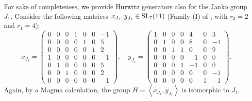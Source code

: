 \documentclass{amsart}
\theoremstyle{remark}
\begin{document}
For sake of completeness, we  provide Hurwitz generators also for the Janko  group $J_1$.
Consider the following matrices $x_{J_1},y_{J_1}\in {\mathop{\rm SL}\nolimits}_7(11)$ (Family (I) of \cite{TV2}, with $r_3=2$ and $r_4=4$):
$$
x_{J_1}=\begin{pmatrix}
 0 &  0 &  0 &  1 &  0 &  0 & -1\\
 0 &  0 &  0 &  0 &  1 &  0 &  5\\
 0 &  0 &  0 &  0 &  0 &  1 &  2\\
 1 &  0 &  0 &  0 &  0 &  0 & -1\\
 0 &  1 &  0 &  0 &  0 &  0 &  5\\
 0 &  0 &  1 &  0 &  0 &  0 &  2\\
 0 &  0 &  0 &  0 &  0 &  0 & -1
\end{pmatrix}, \quad
y_{J_1}=\begin{pmatrix}
 1 &  0 &  0 &  0 &  4 &  0 &  3\\
 0 &  1 &  0 &  0 &  8 &  0 & -1\\
 0 &  0 &  1 &  1 &  0 &  0 &  9\\
 0 &  0 &  0 &  0 & -1 &  0 &  0\\
 0 &  0 &  0 &  1 & -1 &  0 &  0\\
 0 &  0 &  0 &  0 &  0 &  0 & -1\\
 0 &  0 &  0 &  0 &  0 &  1 & -1
\end{pmatrix}.
$$
Again, by a Magma calculation, the group $H=\left\langle x_{J_1} , y_{J_1}\right\rangle$  is isomorphic to $J_1$.
\end{document}
